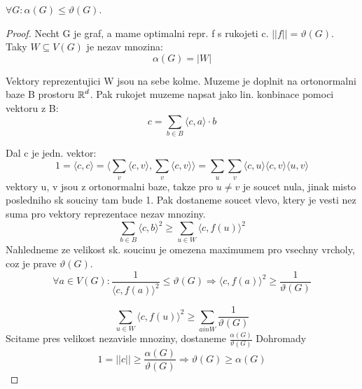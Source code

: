 \begin{lemma}
	$\forall G : \alpha(G) \leq \vartheta(G)$.
\end{lemma}
\begin{proof}
	Necht G je graf, a mame optimalni repr. f s rukojeti c. $|| f || = \vartheta(G)$.
	Taky $W \subseteq V(G)$ je nezav mnozina:
	\[ \alpha(G) = |W| \]

	Vektory reprezentujici W jsou na sebe kolme. Muzeme je doplnit na ortonormalni baze B prostoru $\operatorname{\mathbb{R}}^d$.
	Pak rukojet muzeme napsat jako lin. konbinace pomoci vektoru z B:
	\[ c = \sum_{b \in B} \langle c, a \rangle \cdot b \]

	Dal c je jedn. vektor:
	\[ 1 = \langle c, c \rangle = \langle \sum_v \langle c,v \rangle, \sum_v \langle c,v \rangle \rangle = \sum_u \sum_v \langle c,u \rangle \langle c, v \rangle \langle u, v \rangle \]
	vektory u, v jsou z ortonormalni baze, takze pro $u \ne v$ je soucet nula, jinak misto posledniho sk souciny tam bude 1. Pak dostaneme soucet vlevo, ktery je vesti nez suma pro vektory reprezentace nezav mnoziny.
	\[ \sum_{b \in B} \langle c, b \rangle^2 \geq \sum_{u \in W} \langle c, f(u) \rangle^2 \]
	Nahledneme ze velikost sk. soucinu je omezena maximumem pro vsechny vrcholy, coz je prave $\vartheta(G)$.
	\[ \forall a \in V(G): \frac{1}{\langle c, f(a) \rangle^2} \leq \vartheta(G) \Rightarrow \langle c, f(a) \rangle^2 \geq \frac{1}{\vartheta(G)} \]

	\[ \sum_{u \in W} \langle c, f(u) \rangle^2 \geq \sum_{a in W} \frac{1}{\vartheta(G)} \]
	Scitame pres velikost nezavisle mnoziny, dostaneme $ \frac{\alpha(G)}{\vartheta(G)} $
	Dohromady
	\[ 1 = || c || \geq \frac{\alpha(G)}{\vartheta(G)} \Rightarrow \vartheta(G) \geq \alpha(G) \]
\end{proof}

